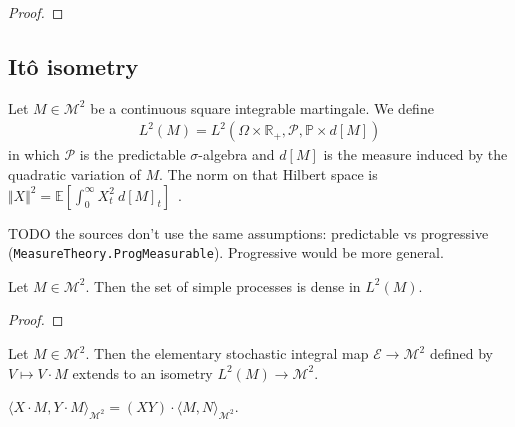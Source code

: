 \begin{proof}

\end{proof}


\subsection{Itô isometry}

\begin{definition}\label{def:L2M}
Let $M \in \mathcal{M}^2$ be a continuous square integrable martingale. We define
\begin{align*}
  L^2(M) = L^2(\Omega \times \mathbb{R}_+, \mathcal{P}, \mathbb{P} \times d[M])
\end{align*}
in which $\mathcal{P}$ is the predictable $\sigma$-algebra and $d[M]$ is the measure induced by the quadratic variation of $M$.
The norm on that Hilbert space is $\Vert X \Vert^2 = \mathbb{E}\left[ \int_0^{\infty} X_t^2 \: d[M]_t \right]$~.
\end{definition}

TODO the sources don't use the same assumptions: predictable vs progressive (\texttt{MeasureTheory.ProgMeasurable}). Progressive would be more general.


\begin{lemma}\label{lem:dense_simpleProcess}
Let $M \in \mathcal{M}^2$. Then the set of simple processes is dense in $L^2(M)$.
\end{lemma}

\begin{proof}

\end{proof}


\begin{definition}\label{def:itoIsometry}
Let $M \in \mathcal{M}^2$. Then the elementary stochastic integral map $\mathcal{E} \to \mathcal{M}^2$ defined by $V \mapsto V \cdot M$ extends to an isometry $L^2(M) \to \mathcal{M}^2$.
\end{definition}


\begin{lemma}\label{lem:inner_itoIsometry}
$\langle X \cdot M, Y \cdot M \rangle_{\mathcal{M}^2} = (XY) \cdot \langle M, N \rangle_{\mathcal{M}^2}$.
\end{lemma}


